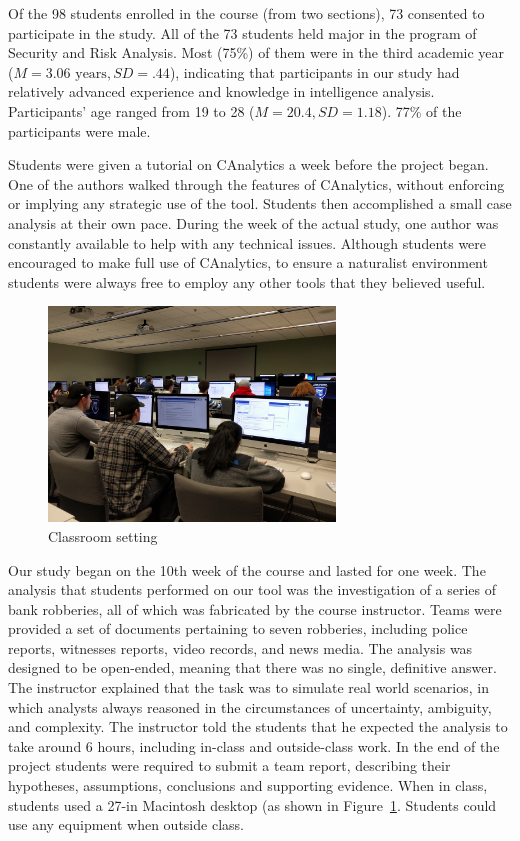 Of the 98 students enrolled in the course (from
two sections), 73 consented to participate in the study. All of the 73 students
held major in the program of Security and Risk Analysis. Most (75\%) of them
were in the third academic year ($M=3.06 \text{ years}, SD=.44$), indicating that participants in
our study had relatively advanced experience and knowledge in intelligence
analysis. Participants' age ranged from 19 to 28 ($M=20.4, SD=1.18$). 77\% of the
participants were male.

Students were given a tutorial on CAnalytics a week before the project began.
One of the authors walked through the features of CAnalytics, without enforcing or implying any strategic use of the tool. Students then accomplished a small case analysis at their own pace. During the week of the
actual study, one author was constantly available to help with any technical
issues. Although students were encouraged to make full use of CAnalytics, to
ensure a naturalist environment students were always free to employ any other
tools that they believed useful.

\begin{figure} \centering
\includegraphics[width=3in]{./img/classroom_setting.jpg} \caption{Classroom
setting}\label{fig:classroom} \end{figure}

Our study began on the 10th week of the course and lasted for one week. The
analysis that students performed on our tool was the investigation of a series
of bank robberies, all of which was fabricated by the course instructor. Teams
were provided a set of documents pertaining to seven robberies, including police
reports, witnesses reports, video records, and news media. The analysis was
designed to be open-ended, meaning that there was no single, definitive answer.
The instructor explained that the task was to simulate real world scenarios, in
which analysts always reasoned in the circumstances of uncertainty, ambiguity,
and complexity. The instructor told the students that he expected the analysis
to take around 6 hours, including in-class and outside-class work. In the end of
the project students were required to submit a team report, describing their
hypotheses, assumptions, conclusions and supporting evidence. When in class, students used a 27-in Macintosh desktop (as shown in Figure~\ref{fig:classroom}. Students could use any equipment when outside class.


